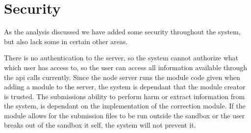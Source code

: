 \chapter{Security}
As the analysis discussed we have added some security throughout the system, but also lack some in certain other areas.

There is no authentication to the server, so the system cannot authorize what which user has access to, so the user can access all information available through the api calls currently. Since the node server runs the module code given when adding a module to the server, the system is dependant that the module creator is trusted. The submissions ability to perform harm or extract information from the system, is dependant on the implementation of the correction module. If the module allows for the submission files to be run outside the sandbox or the user breaks out of the sandbox it self, the system will not prevent it.
